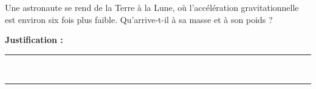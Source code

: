 Une astronaute se rend de la Terre à la Lune, où l'accélération gravitationnelle est environ six fois plus faible. Qu'arrive-t-il à sa masse et à son poids ?

\choices

\noindent\textbf{Justification :} \hrulefill \\[2.5ex]
\rule{\linewidth}{0.4pt} \\[2.5ex]
\rule{\linewidth}{0.4pt}
\vfill

